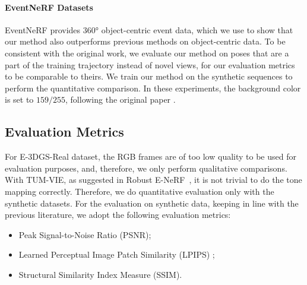 \paragraph{EventNeRF Datasets}
EventNeRF \cite{eventnerf} provides $\ang{360}$ object-centric event data, which we use to show that our method also outperforms previous methods on object-centric data. To be consistent with the original work, we evaluate our method on poses that are a part of the training trajectory instead of novel views, for our evaluation metrics to be comparable to theirs. We train our method on the synthetic sequences to perform the quantitative comparison. In these experiments, the background color is set to $159/255$, following the original paper \cite{eventnerf}. 







\subsection{Evaluation Metrics} 
For E-3DGS-Real dataset, the RGB frames are of too low quality to be used for evaluation purposes, and, therefore, we only perform qualitative comparisons. 
With TUM-VIE, as suggested in Robust E-NeRF~\cite{robust_enerf}, it is not trivial to do the tone mapping correctly. 
Therefore, we do quantitative evaluation only with the synthetic datasets. 
For the evaluation on synthetic data, keeping in line with the previous literature, we adopt the following evaluation metrics: 
\begin{itemize} 
    \item Peak Signal-to-Noise Ratio (PSNR); 
    \item Learned Perceptual Image Patch Similarity (LPIPS) \cite{LPIPS}; 
    \item Structural Similarity Index Measure (SSIM). 
\end{itemize} 



